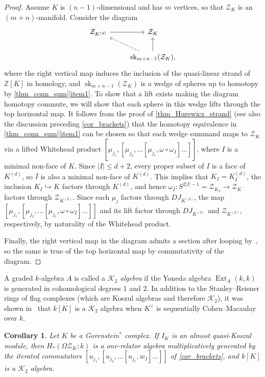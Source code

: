 \documentclass[a4paper,10pt]{amsart}
\newtheorem{corollary}[theorem]{Corollary}
\theoremstyle{definition}
\theoremstyle{remark}
\DeclareMathOperator{\Ext}{Ext}
\begin{document}
\begin{proof}
Assume $K$ is $(n-1)$-dimensional and has $m$ vertices, so that $\mathcal{Z}_K$ is an $(m+n)$-manifold. Consider the diagram
\[
\begin{tikzcd}
\mathcal{Z}_{K^{(d)}} \ar[r] & \mathcal{Z}_K\\
& \operatorname{sk}_{m+n-1}(\mathcal{Z}_K), \ar[ul,dashed] \ar[u]
\end{tikzcd}
\]
where the right vertical map induces the inclusion of the quasi-linear strand of $\mathbb{Z}[K]$ in homology, and $\operatorname{sk}_{m+n-1}(\mathcal{Z}_K)$ is a wedge of spheres up to homotopy by \cref{thm_conn_sum}\ref{item1}. To show that a lift exists making the diagram homotopy commute, we will show that each sphere in this wedge lifts through the top horizontal map. It follows from the proof of \cref{thm_Hurewicz_strand} (see also the discussion preceding \cref{cor_brackets}) that the homotopy equivalence in \cref{thm_conn_sum}\ref{item1} can be chosen so that each wedge summand maps to $\mathcal{Z}_K$ via a lifted Whitehead product $[\overline{\mu_{j_1},[\mu_{j_2},\ldots[\mu_{j_r},\omega\circ\omega_I]\ldots]}]$, where $I$ is a minimal non-face of $K$. Since $|I|\leqslant d+2$, every proper subset of $I$ is a face of $K^{(d)}$, so $I$ is also a minimal non-face of $K^{(d)}$. This implies that $K_I=K^{(d)}_I$, the inclusion $K_I\hookrightarrow K$ factors through $K^{(d)}$, and hence $\omega_I\colon S^{2|I|-1}=\mathcal{Z}_{K_I} \to \mathcal{Z}_K$ factors through $\mathcal{Z}_{K^{(d)}}$. Since each $\mu_j$ factors through $DJ_{K^{(d)}}$, the map $[\mu_{j_1},[\mu_{j_2},\ldots[\mu_{j_r},\omega\circ\omega_I]\ldots]]$ and its lift factor through $DJ_{K^{(d)}}$ and $\mathcal{Z}_{K^{(d)}}$, respectively, by naturality of the Whitehead product.

Finally, the right vertical map in the diagram admits a section after looping by~\cite[Proposition~3.2(ii)]{BT}, so the same is true of the top horizontal map by commutativity of the diagram.
\end{proof}

A graded $k$-algebra $A$ is called a \emph{$\mathcal{K}_2$ algebra} if the Yoneda algebra $\Ext_A(k,k)$ is generated in cohomological degrees $1$ and $2$. In addition to the Stanley--Reisner rings of flag complexes (which are Koszul algebras and therefore $\mathcal{K}_2$), it was shown in~\cite[Theorem~1.3]{CS} that $k[K]$ is a $\mathcal{K}_2$ algebra when $K^\vee$ is sequentially Cohen--Macaulay over $k$.

\begin{corollary}
Let $K$ be a Gorenstein$^*$ complex. If $I_K$ is an almost quasi-Koszul module, then $H_*(\Omega\mathcal{Z}_K;k)$ is a one-relator algebra multiplicatively generated by the iterated commutators $[u_{j_1},[u_{j_2},\ldots[u_{j_r},w_I]\ldots]]$ of \cref{cor_brackets}, and $k[K]$ is a $\mathcal{K}_2$ algebra.
\end{corollary}
\end{document}

